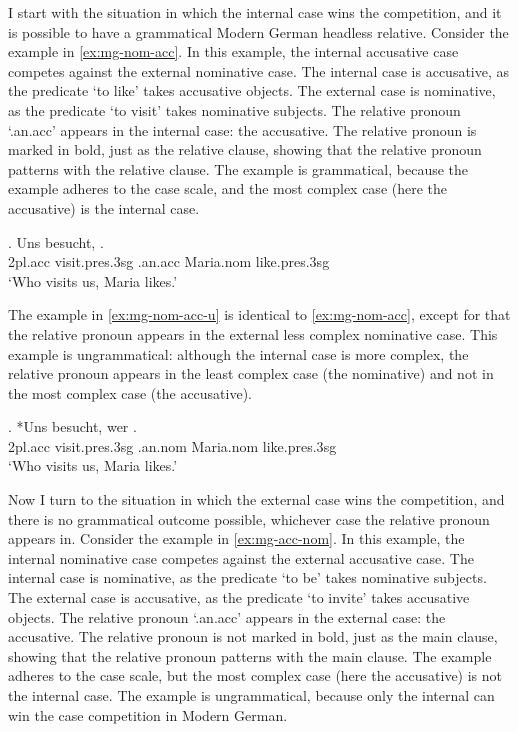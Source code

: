 I start with the situation in which the internal case wins the competition, and it is possible to have a grammatical Modern German headless relative.
Consider the example in \ref{ex:mg-nom-acc}. In this example, the internal accusative case competes against the external nominative case.
The internal case is accusative, as the predicate  `to like' takes accusative objects.
The external case is nominative, as the predicate  `to visit' takes nominative subjects.
The relative pronoun  `.\ac{an}.\ac{acc}' appears in the internal case: the accusative. The relative pronoun is marked in bold, just as the relative clause, showing that the relative pronoun patterns with the relative clause.
The example is grammatical, because the example adheres to the case scale, and the most complex case (here the accusative) is the internal case.

\exg. Uns besucht,   .\\
 2\ac{pl}.\ac{acc} visit.\ac{pres}.3\ac{sg}\scsub{[nom]} .\ac{an}.\ac{acc} Maria.\ac{nom} like.\ac{pres}.3\ac{sg}\scsub{[acc]}\\
 `Who visits us, Maria likes.' \label{ex:mg-nom-acc}

The example in \ref{ex:mg-nom-acc-u} is identical to \ref{ex:mg-nom-acc}, except for that the relative pronoun appears in the external less complex nominative case. This example is ungrammatical: although the internal case is more complex, the relative pronoun appears in the least complex case (the nominative) and not in the most complex case (the accusative).

\exg. *Uns besucht, wer  .\\
 2\ac{pl}.\ac{acc} visit.\ac{pres}.3\ac{sg}\scsub{[nom]} .\ac{an}.\ac{nom} Maria.\ac{nom} like.\ac{pres}.3\ac{sg}\scsub{[acc]}\\
 `Who visits us, Maria likes.' \label{ex:mg-nom-acc-u}

Now I turn to the situation in which the external case wins the competition, and there is no grammatical outcome possible, whichever case the relative pronoun appears in.
Consider the example in \ref{ex:mg-acc-nom}. In this example, the internal nominative case competes against the external accusative case.
The internal case is nominative, as the predicate  `to be' takes nominative subjects.
The external case is accusative, as the predicate  `to invite' takes accusative objects.
The relative pronoun  `.\ac{an}.\ac{acc}' appears in the external case: the accusative. The relative pronoun is not marked in bold, just as the main clause, showing that the relative pronoun patterns with the main clause.
The example adheres to the case scale, but the most complex case (here the accusative) is not the internal case. The example is ungrammatical, because only the internal can win the case competition in Modern German.

